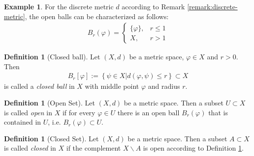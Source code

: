 \documentclass[12pt, a4paper]{article}
\numberwithin{equation}{section}
\theoremstyle{definition}
\theoremstyle{definition}
\newtheorem{defn}[thm]{Definition} %
\newtheorem{exmp}[thm]{Example} %
\begin{document}
 	\begin{exmp}\label{exmp:open-balls-discrete-metric}
 		For the discrete metric $d$ according to Remark \ref{remark:discrete-metric}, the open balls can be characterized as follows:
 		\begin{align}
 			B_{r}(\varphi) = \begin{cases}
 				\{\varphi\}, &r \leq 1 
 				\\ X, &r > 1
 			\end{cases}
 		\end{align}
 	\end{exmp} 
	
	 \begin{defn}[Closed ball]
		Let $(X, d)$ be a metric space, $\varphi\in X$ and $r > 0$. Then 
		\begin{align}
			B_{r}[\varphi] := \left\{ \psi\in X \vert d(\varphi, \psi) \leq r\right\} \subset X
		\end{align}
		is called a \textit{closed ball} in $X$ with middle point $\varphi$ and radius $r$. 
	\end{defn}
	
	\begin{defn}[Open Set]
		\label{defn-open-set}
		Let $(X, d)$ be a metric space. Then a subset $U\subset X$ is called \textit{open} in $X$ if for every $\varphi \in U$ there is an open ball $B_{r}(\varphi)$ that is contained in $U$, i.e. $B_r(\varphi)\subset U$. 
	\end{defn}

	\begin{defn}[Closed Set]
		Let $(X, d)$ be a metric space. Then a subset $A\subset X$ is called \textit{closed} in $X$ if the complement $X\backslash A$ is open according to Definition \ref{defn-open-set}. 
	\end{defn}
\end{document}
